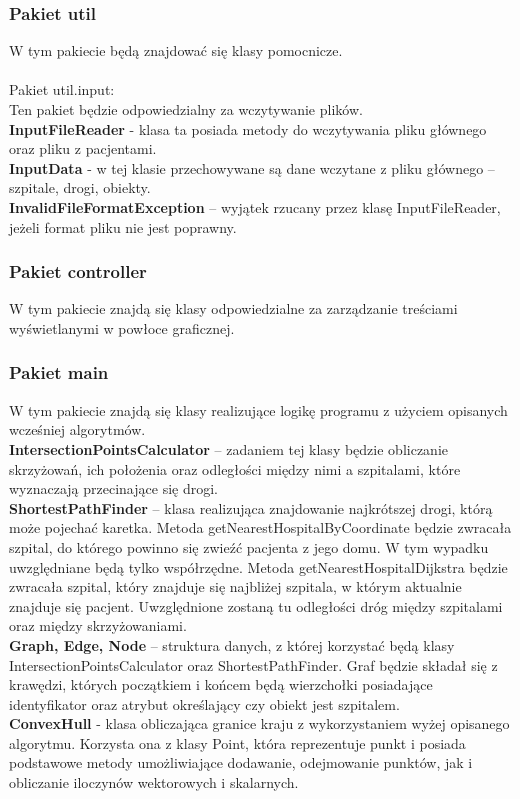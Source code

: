 \documentclass{article}
\begin{document}
\subsubsection{Pakiet util}
W tym pakiecie będą znajdować się klasy pomocnicze.\\\\
Pakiet util.input:\\
Ten pakiet będzie odpowiedzialny za wczytywanie plików. \\
\textbf{InputFileReader} - klasa ta posiada metody do wczytywania pliku głównego oraz pliku z pacjentami.\\
\textbf{InputData} - w tej klasie przechowywane są dane wczytane z pliku głównego -- szpitale, drogi, obiekty. \\
\textbf{InvalidFileFormatException} -- wyjątek rzucany przez klasę InputFileReader, jeżeli format pliku nie jest poprawny. 
\subsubsection{Pakiet controller}
W tym pakiecie znajdą się klasy odpowiedzialne za zarządzanie treściami wyświetlanymi w powłoce graficznej.
\subsubsection{Pakiet main}
W tym pakiecie znajdą się klasy realizujące logikę programu z użyciem opisanych wcześniej algorytmów.\\
\textbf{IntersectionPointsCalculator} -- zadaniem tej klasy będzie obliczanie skrzyżowań, ich położenia oraz odległości między nimi a szpitalami, które wyznaczają przecinające się drogi. \\
\textbf{ShortestPathFinder} -- klasa realizująca znajdowanie najkrótszej drogi, którą może pojechać karetka. Metoda getNearestHospitalByCoordinate będzie zwracała szpital, do którego powinno się zwieźć pacjenta z jego domu. W tym wypadku uwzględniane będą tylko współrzędne. Metoda getNearestHospitalDijkstra będzie zwracała szpital, który znajduje się najbliżej szpitala, w którym aktualnie znajduje się pacjent. Uwzględnione zostaną tu odległości dróg między szpitalami oraz między skrzyżowaniami.\\
\textbf{Graph, Edge, Node} -- struktura danych, z której korzystać będą klasy IntersectionPointsCalculator oraz ShortestPathFinder. Graf będzie składał się z krawędzi, których początkiem i końcem będą wierzchołki posiadające identyfikator oraz atrybut określający czy obiekt jest szpitalem.\\
\textbf{ConvexHull} - klasa obliczająca granice kraju z wykorzystaniem wyżej opisanego algorytmu. Korzysta ona z klasy Point, która reprezentuje punkt i posiada podstawowe metody umożliwiające dodawanie, odejmowanie punktów, jak i obliczanie iloczynów wektorowych i skalarnych.
\end{document}
